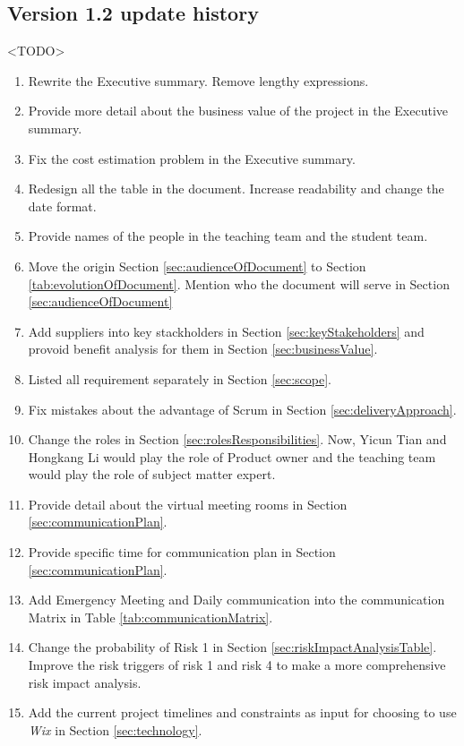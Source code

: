 \documentclass{report}
\begin{document}
\subsection{Version 1.2 update history}
\label{sec:v1-2Up}
<TODO>
  \begin{enumerate}
    \item Rewrite the Executive summary. Remove lengthy expressions.
    \item Provide more detail about the business value of the project in the Executive summary.
    \item Fix the cost estimation problem in the Executive summary.
    \item Redesign all the table in the document. Increase readability and change the date format.
    \item Provide names of the people in the teaching team and the student team.
    \item Move the origin Section \ref{sec:audienceOfDocument} to Section \ref{tab:evolutionOfDocument}. Mention who the document will serve in Section \ref{sec:audienceOfDocument}
    \item Add suppliers into key stackholders in Section \ref{sec:keyStakeholders} and provoid benefit analysis for them in Section \ref{sec:businessValue}.
    \item Listed all requirement separately in Section \ref{sec:scope}.
    \item Fix mistakes about the advantage of Scrum in Section \ref{sec:deliveryApproach}.
    \item Change the roles in Section \ref{sec:rolesResponsibilities}. Now, Yicun Tian and Hongkang Li would play the role of Product owner and the teaching team would play the role of subject matter expert.
    \item Provide detail about the virtual meeting rooms in Section \ref{sec:communicationPlan}.
    \item Provide specific time for communication plan in Section \ref{sec:communicationPlan}.
    \item Add Emergency Meeting and Daily communication into the communication Matrix in Table \ref{tab:communicationMatrix}.
    \item Change the probability of Risk 1 in Section \ref{sec:riskImpactAnalysisTable}. Improve the risk triggers of risk 1 and risk 4 to make a more comprehensive risk impact analysis.
	  \item Add the current project timelines and constraints as input for choosing to use \textit{Wix} in Section \ref{sec:technology}.

\end{enumerate}
\end{document}
